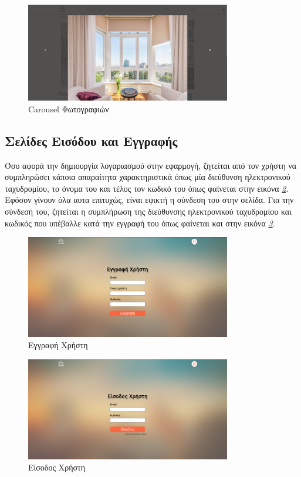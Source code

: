 \documentclass[manuscript,screen,review, language=greek, language=english]{acmart}
\begin{document}
	\begin{figure}[H]
		   \includegraphics[width=0.8\textwidth]{listing_carousel.png}
		   \caption{Carousel Φωτογραφιών}
		   \label{fig:carousel}
	\end{figure}

\subsection{Σελίδες Εισόδου και Εγγραφής}
	Όσο αφορά την δημιουργία λογαριασμού στην εφαρμογή, ζητείται από τον χρήστη να
	συμπληρώσει κάποια απαραίτητα χαρακτηριστικά όπως μία διεύθυνση ηλεκτρονικού
	ταχυδρομίου, το όνομα του και τέλος τον κωδικό του όπως φαίνεται στην εικόνα
	\emph{\ref{fig:sign_up}}. Εφόσον γίνουν όλα αυτα επιτυχώς, είναι εφικτή η σύνδεση
	του στην σελίδα. Για την σύνδεση του, ζητείται η συμπλήρωση της διεύθυνσης
	ηλεκτρονικού ταχυδρομίου και κωδικός που υπέβαλλε κατά την εγγραφή του όπως φαίνεται
	και στην εικόνα \emph{\ref{fig:sign_in}}.

	\begin{figure}[H]
		   \includegraphics[width=0.8\textwidth]{sign_up_page.png}
		   \caption{Εγγραφή Χρήστη}
		   \label{fig:sign_up}
	\end{figure}

	\begin{figure}[H]
		   \includegraphics[width=0.8\textwidth]{sign_in_page.png}
		   \caption{Είσοδος Χρήστη}
		   \label{fig:sign_in}
	\end{figure}
\end{document}
